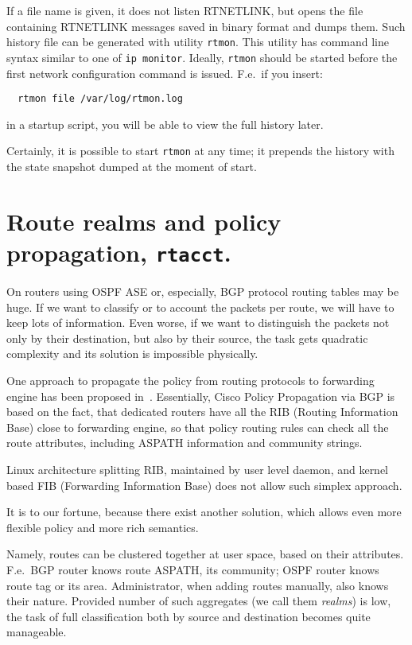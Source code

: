If a file name is given, it does not listen RTNETLINK,
but opens the file containing RTNETLINK messages saved in binary format
and dumps them. Such history file can be generated with utility
\verb|rtmon|. This utility has command line syntax similar to one
of \verb|ip monitor|.
Ideally, \verb|rtmon| should be started before
the first network configuration command is issued. F.e.\ if
you insert:
\begin{verbatim}
  rtmon file /var/log/rtmon.log
\end{verbatim}
in a startup script, you will be able to view the full history
later.

Certainly, it is possible to start \verb|rtmon| at any time;
it prepends the history with the state snapshot dumped at the moment
of start.


\section{Route realms and policy propagation, {\tt rtacct}.}
\label{RT-REALMS}

On routers using OSPF ASE or, especially, BGP protocol routing
tables may be huge. If we want to classify or to account the packets
per route, we will have to keep lots of information. Even worse, if we
want to distinguish the packets not only by their destination, but
also by their source, the task gets quadratic complexity and its solution
is impossible physically.

One approach to propagate the policy from routing protocols
to forwarding engine has been proposed in~\cite{IOS-BGP-PP}.
Essentially, Cisco Policy Propagation via BGP is based on the fact,
that dedicated routers have all the RIB (Routing Information Base)
close to forwarding engine, so that policy routing rules can
check all the route attributes, including ASPATH information
and community strings.

Linux architecture splitting RIB, maintained by user level
daemon, and kernel based FIB (Forwarding Information Base)
does not allow such simplex approach.

It is to our fortune, because there exist another solution,
which allows even more flexible policy and more rich semantics.

Namely, routes can be clustered together at user space, based on their
attributes.  F.e.\ BGP router knows route ASPATH, its community;
OSPF router knows route tag or its area. Administrator, when adding
routes manually, also knows their nature. Provided number of such
aggregates (we call them {\em realms\/}) is low, the task of full
classification both by source and destination becomes quite manageable.

